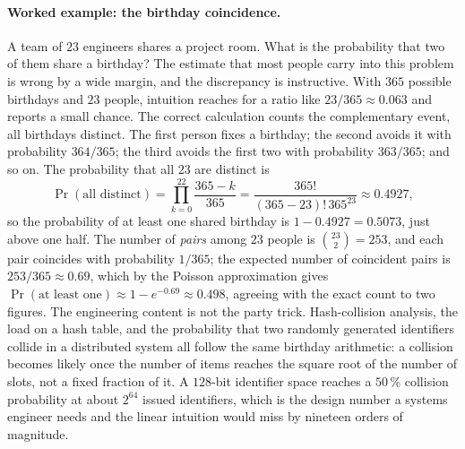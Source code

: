 \paragraph{Worked example: the birthday coincidence.}
A team of $23$ engineers shares a project room. What is the
probability that two of them share a birthday? The estimate that
most people carry into this problem is wrong by a wide margin, and
the discrepancy is instructive. With $365$ possible birthdays and
$23$ people, intuition reaches for a ratio like $23/365 \approx
0.063$ and reports a small chance. The correct calculation counts
the complementary event, all birthdays distinct. The first person
fixes a birthday; the second avoids it with probability $364/365$;
the third avoids the first two with probability $363/365$; and so
on. The probability that all $23$ are distinct is
\[
\Pr(\text{all distinct}) = \prod_{k=0}^{22} \frac{365 - k}{365}
= \frac{365!}{(365 - 23)! \, 365^{23}} \approx 0.4927,
\]
so the probability of at least one shared birthday is
$1 - 0.4927 = 0.5073$, just above one half. The number of
\emph{pairs} among $23$ people is $\binom{23}{2} = 253$, and each
pair coincides with probability $1/365$; the expected number of
coincident pairs is $253/365 \approx 0.69$, which by the Poisson
approximation gives $\Pr(\text{at least one}) \approx 1 - e^{-0.69}
\approx 0.498$, agreeing with the exact count to two figures. The
engineering content is not the party trick. Hash-collision
analysis, the load on a hash table, and the probability that two
randomly generated identifiers collide in a distributed system all
follow the same birthday arithmetic: a collision becomes likely
once the number of items reaches the square root of the number of
slots, not a fixed fraction of it. A $128$-bit identifier space
reaches a $50\,\%$ collision probability at about $2^{64}$ issued
identifiers, which is the design number a systems engineer needs and
the linear intuition would miss by nineteen orders of magnitude.

